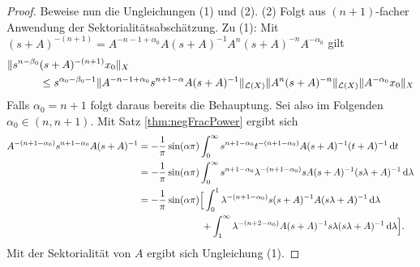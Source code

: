 \begin{proof}
  Beweise nun die Ungleichungen (1) und (2).
  (2) Folgt aus $(n + 1)$-facher Anwendung der Sektorialitätsabschätzung.
  Zu (1): Mit $(s + A)^{-(n + 1)} = A^{-n - 1 + \alpha_0} A (s + A)^{-1} A^n (s + A)^{-n} A^{-\alpha_0}$ gilt
  \begin{align*}
    \|s^{n - \beta_0} &(s + A)^{- (n + 1)} x_0 \|_X \\
    &\leq s^{\alpha_0 - \beta_0 - 1} \|A^{-n - 1+ \alpha_0} s^{n + 1 - \alpha} A(s + A)^{-1}\|_{\mathcal{L}(X)} \|A^n(s+A)^{-n}\|_{\mathcal{L}(X)} \|A^{-\alpha_0} x_0 \|_X
  \end{align*}
  Falls $\alpha_0 = n + 1$ folgt daraus bereits die Behauptung.
  Sei also im Folgenden $\alpha_0 \in (n, n + 1)$.
  Mit Satz \ref{thm:negFracPower} ergibt sich
  \begin{align*}
    A^{-(n + 1 - \alpha_0)} s^{n + 1 - \alpha_0} A (s + A)^{-1}
    &= -\frac{1}{\pi} \sin(\alpha \pi) \int_0^\infty s^{n + 1 - \alpha_0} t^{-(n + 1 - \alpha_0)} A (s + A)^{-1} (t + A)^{-1} \d t \\
    &= -\frac{1}{\pi} \sin(\alpha \pi) \int_0^\infty s^{n + 1 - \alpha_0} \lambda^{-(n + 1 - \alpha_0)} s A(s + A)^{-1} (s\lambda + A)^{-1} \d \lambda \\
    &= -\frac{1}{\pi} \sin(\alpha \pi) \Big[ \int_0^1 \lambda^{-(n + 1 - \alpha_0)} s (s + A)^{-1} A (s \lambda + A)^{-1} \d \lambda \\
    &\hphantom{= -\frac{1}{\pi} \sin(\alpha \pi) \Big[ }  +\int_1^\infty \lambda^{-(n + 2 - \alpha_0)} A (s + A)^{-1} s \lambda (s \lambda + A)^{-1} \d \lambda \Big].
  \end{align*}
  Mit der Sektorialität von $A$ ergibt sich Ungleichung (1).
\end{proof}
